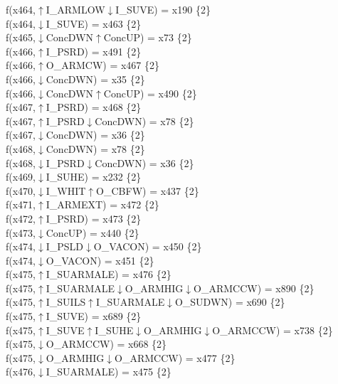 f(x464,$\uparrow$I\_ARMLOW$\downarrow$I\_SUVE) = x190 \{2\} \\  
f(x464,$\downarrow$I\_SUVE) = x463 \{2\} \\  
f(x465,$\downarrow$ConcDWN$\uparrow$ConcUP) = x73 \{2\} \\  
f(x466,$\uparrow$I\_PSRD) = x491 \{2\} \\  
f(x466,$\uparrow$O\_ARMCW) = x467 \{2\} \\  
f(x466,$\downarrow$ConcDWN) = x35 \{2\} \\  
f(x466,$\downarrow$ConcDWN$\uparrow$ConcUP) = x490 \{2\} \\  
f(x467,$\uparrow$I\_PSRD) = x468 \{2\} \\  
f(x467,$\uparrow$I\_PSRD$\downarrow$ConcDWN) = x78 \{2\} \\  
f(x467,$\downarrow$ConcDWN) = x36 \{2\} \\  
f(x468,$\downarrow$ConcDWN) = x78 \{2\} \\  
f(x468,$\downarrow$I\_PSRD$\downarrow$ConcDWN) = x36 \{2\} \\  
f(x469,$\downarrow$I\_SUHE) = x232 \{2\} \\  
f(x470,$\downarrow$I\_WHIT$\uparrow$O\_CBFW) = x437 \{2\} \\  
f(x471,$\uparrow$I\_ARMEXT) = x472 \{2\} \\  
f(x472,$\uparrow$I\_PSRD) = x473 \{2\} \\  
f(x473,$\downarrow$ConcUP) = x440 \{2\} \\  
f(x474,$\downarrow$I\_PSLD$\downarrow$O\_VACON) = x450 \{2\} \\  
f(x474,$\downarrow$O\_VACON) = x451 \{2\} \\  
f(x475,$\uparrow$I\_SUARMALE) = x476 \{2\} \\  
f(x475,$\uparrow$I\_SUARMALE$\downarrow$O\_ARMHIG$\downarrow$O\_ARMCCW) = x890 \{2\} \\  
f(x475,$\uparrow$I\_SUILS$\uparrow$I\_SUARMALE$\downarrow$O\_SUDWN) = x690 \{2\} \\  
f(x475,$\uparrow$I\_SUVE) = x689 \{2\} \\  
f(x475,$\uparrow$I\_SUVE$\uparrow$I\_SUHE$\downarrow$O\_ARMHIG$\downarrow$O\_ARMCCW) = x738 \{2\} \\  
f(x475,$\downarrow$O\_ARMCCW) = x668 \{2\} \\  
f(x475,$\downarrow$O\_ARMHIG$\downarrow$O\_ARMCCW) = x477 \{2\} \\  
f(x476,$\downarrow$I\_SUARMALE) = x475 \{2\} \\  
